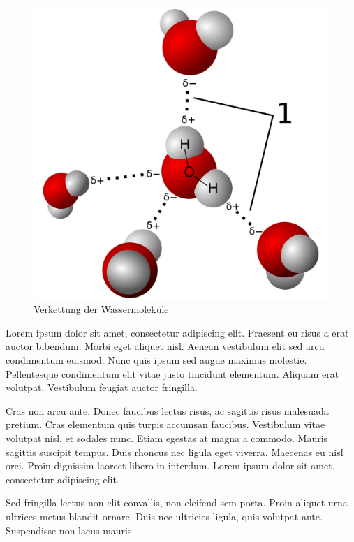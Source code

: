 \begin{figure}
	\includegraphics[width=\linewidth]{content/to-be-removed/1032px-3D_model_hydrogen_bonds_in_water.svg.png}
	\caption{Verkettung der Wassermoleküle \cite{TestCitation021}}
\end{figure}

Lorem ipsum dolor sit amet, consectetur adipiscing elit. Praesent eu risus a erat auctor bibendum. Morbi eget aliquet nisl. Aenean vestibulum elit sed arcu condimentum euismod. Nunc quis ipsum sed augue maximus molestie. Pellentesque condimentum elit vitae justo tincidunt elementum. Aliquam erat volutpat. Vestibulum feugiat auctor fringilla.

Cras non arcu ante. Donec faucibus lectus risus, ac sagittis risus malesuada pretium. Cras elementum quis turpis accumsan faucibus. Vestibulum vitae volutpat nisl, et sodales nunc. Etiam egestas at magna a commodo. Mauris sagittis suscipit tempus. Duis rhoncus nec ligula eget viverra. Maecenas eu nisl orci. Proin dignissim laoreet libero in interdum. Lorem ipsum dolor sit amet, consectetur adipiscing elit.

Sed fringilla lectus non elit convallis, non eleifend sem porta. Proin aliquet urna ultrices metus blandit ornare. Duis nec ultricies ligula, quis volutpat ante. Suspendisse non lacus mauris.

